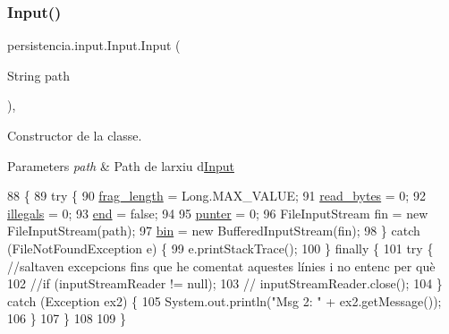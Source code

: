 \subsubsection{\texorpdfstring{Input()}{Input()}}
{\footnotesize\ttfamily persistencia.\+input.\+Input.\+Input (\begin{DoxyParamCaption}\item[{String}]{path }\end{DoxyParamCaption})\hspace{0.3cm}{\ttfamily [inline]}, {\ttfamily [private]}}



Constructor de la classe. 


\begin{DoxyParams}{Parameters}
{\em path} & Path de l\textquotesingle{}arxiu d\textquotesingle{}\hyperlink{classpersistencia_1_1input_1_1Input}{Input} \\
\hline
\end{DoxyParams}

\begin{DoxyCode}
88                                \{
89         \textcolor{keywordflow}{try} \{   
90             \hyperlink{classpersistencia_1_1input_1_1Input_adae91120899054fe5200d5e307840042}{frag\_length} = Long.MAX\_VALUE;
91             \hyperlink{classpersistencia_1_1input_1_1Input_ace2c934234f82fb07ae169b50f71cd32}{read\_bytes} = 0;
92             \hyperlink{classpersistencia_1_1input_1_1Input_ad3132949d4ac469b5f4d77373389f9f1}{illegals} = 0;
93             \hyperlink{classpersistencia_1_1input_1_1Input_aa986cd4af0178e1a80f551dcd8936125}{end} = \textcolor{keyword}{false};
94 
95             \hyperlink{classpersistencia_1_1input_1_1Input_abe76388d0ac9eeafdba673ad2138f8dc}{punter} = 0;
96             FileInputStream fin = \textcolor{keyword}{new} FileInputStream(path);
97             \hyperlink{classpersistencia_1_1input_1_1Input_aa4b622d30a090256ce05c5082cdb0791}{bin} = \textcolor{keyword}{new} BufferedInputStream(fin);
98         \} \textcolor{keywordflow}{catch} (FileNotFoundException e) \{
99             e.printStackTrace();
100         \} \textcolor{keywordflow}{finally} \{
101             \textcolor{keywordflow}{try} \{ \textcolor{comment}{//saltaven excepcions fins que he comentat aquestes línies i no entenc per què}
102                 \textcolor{comment}{//if (inputStreamReader != null);}
103                 \textcolor{comment}{//    inputStreamReader.close();}
104             \} \textcolor{keywordflow}{catch} (Exception ex2) \{
105                 System.out.println(\textcolor{stringliteral}{"Msg 2: "} + ex2.getMessage());
106             \}
107         \}
108 
109     \}
\end{DoxyCode}



